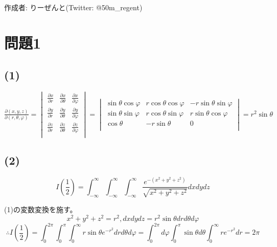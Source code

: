 \documentclass[]{jsarticle}
\begin{document}
作成者: りーぜんと(Twitter: @50m\_regent)
\section*{問題1}
    \subsection*{(1)}
        $
            \displaystyle\frac{\partial (x, y, z)}{\partial (r, \theta, \varphi)} =
            \begin{vmatrix}
                \displaystyle\frac{\partial x}{\partial r} & \displaystyle\frac{\partial x}{\partial \theta} & \displaystyle\frac{\partial x}{\partial \varphi} \\
                \displaystyle\frac{\partial y}{\partial r} & \displaystyle\frac{\partial y}{\partial \theta} & \displaystyle\frac{\partial y}{\partial \varphi} \\
                \displaystyle\frac{\partial z}{\partial r} & \displaystyle\frac{\partial z}{\partial \theta} & \displaystyle\frac{\partial z}{\partial \varphi} \\
            \end{vmatrix} =
            \begin{vmatrix}
                \sin\theta\cos\varphi & r\cos\theta\cos\varphi & -r\sin\theta\sin\varphi \\
                \sin\theta\sin\varphi & r\cos\theta\sin\varphi & r\sin\theta\cos\varphi \\
                \cos\theta & -r\sin\theta & 0 \\
            \end{vmatrix} = r^2\sin\theta
        $
    \subsection*{(2)}
        \begin{equation*}
            I\left(\frac{1}{2}\right) =
            \int^\infty_{-\infty}\int^\infty_{-\infty}\int^\infty_{-\infty}\frac{e^{-(x^2 + y^2 + z^2)}}{\sqrt{x^2 + y^2 + z^2}}dxdydz
        \end{equation*}

        (1)の変数変換を施す。
        \begin{equation*}
            x^2 + y^2 + z^2 = r^2, dxdydz=r^2\sin\theta drd\theta d\varphi
        \end{equation*}
        \begin{equation*}
            \therefore I\left(\frac{1}{2}\right) =
            \int^{2\pi}_0\int^\pi_0\int^\infty_0r\sin\theta e^{-r^2}drd\theta d\varphi =
            \int^{2\pi}_0d\varphi\int^\pi_0\sin\theta d\theta\int^\infty_0re^{-r^2}dr =
            2\pi
        \end{equation*}
\end{document}
